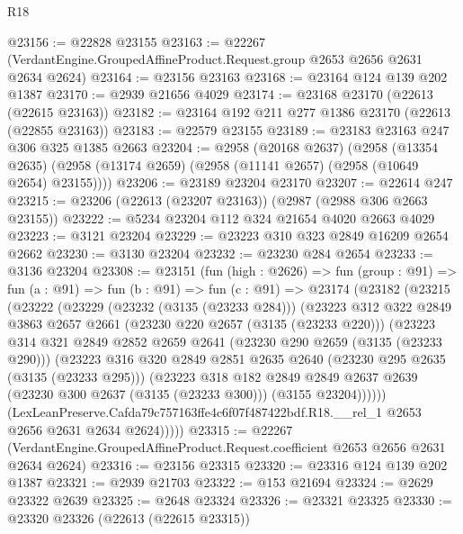 \begin{lexlean}{R18}
\begin{coremodule}
@23156 := @22828 @23155
@23163 := @22267 (VerdantEngine.GroupedAffineProduct.Request.group @2653 @2656 @2631 @2634 @2624)
@23164 := @23156 @23163
@23168 := @23164 @124 @139 @202 @1387
@23170 := @2939 @21656 @4029
@23174 := @23168 @23170 (@22613 (@22615 @23163))
@23182 := @23164 @192 @211 @277 @1386 @23170 (@22613 (@22855 @23163))
@23183 := @22579 @23155
@23189 := @23183 @23163 @247 @306 @325 @1385 @2663
@23204 := @2958
    (@20168 @2637)
    (@2958
      (@13354 @2635)
      (@2958 (@13174 @2659) (@2958 (@11141 @2657) (@2958 (@10649 @2654) @23155))))
@23206 := @23189 @23204 @23170
@23207 := @22614 @247
@23215 := @23206 (@22613 (@23207 @23163)) (@2987 (@2988 @306 @2663 @23155))
@23222 := @5234 @23204 @112 @324 @21654 @4020 @2663 @4029
@23223 := @3121 @23204
@23229 := @23223 @310 @323 @2849 @16209 @2654 @2662
@23230 := @3130 @23204
@23232 := @23230 @284 @2654
@23233 := @3136 @23204
@23308 := @23151
    (fun (high : @2626) =>
    fun (group : @91) =>
    fun (a : @91) =>
    fun (b : @91) =>
    fun (c : @91) =>
    @23174
      (@23182
        (@23215
          (@23222
            (@23229
              (@23232 (@3135 (@23233 @284)))
              (@23223
                @312
                @322
                @2849
                @3863
                @2657
                @2661
                (@23230 @220 @2657 (@3135 (@23233 @220)))
                (@23223
                  @314
                  @321
                  @2849
                  @2852
                  @2659
                  @2641
                  (@23230 @290 @2659 (@3135 (@23233 @290)))
                  (@23223
                    @316
                    @320
                    @2849
                    @2851
                    @2635
                    @2640
                    (@23230 @295 @2635 (@3135 (@23233 @295)))
                    (@23223
                      @318
                      @182
                      @2849
                      @2849
                      @2637
                      @2639
                      (@23230 @300 @2637 (@3135 (@23233 @300)))
                      (@3155 @23204))))))
            (LexLeanPreserve.Cafda79c757163ffe4c6f07f487422bdf.R18.__rel_1
              @2653
              @2656
              @2631
              @2634
              @2624)))))
@23315 := @22267
    (VerdantEngine.GroupedAffineProduct.Request.coefficient @2653 @2656 @2631 @2634 @2624)
@23316 := @23156 @23315
@23320 := @23316 @124 @139 @202 @1387
@23321 := @2939 @21703
@23322 := @153 @21694
@23324 := @2629 @23322 @2639
@23325 := @2648 @23324
@23326 := @23321 @23325
@23330 := @23320 @23326 (@22613 (@22615 @23315))

\end{coremodule}
\end{lexlean}
